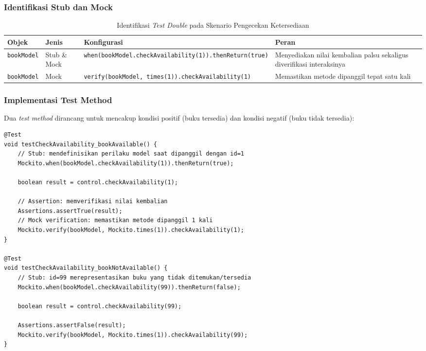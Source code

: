 \documentclass[12pt,a4paper]{article}
\begin{document}
\subsubsection{Identifikasi Stub dan Mock}

\begin{table}[H]
\centering
\caption{Identifikasi \textit{Test Double} pada Skenario Pengecekan Ketersediaan}
\label{tab:stub-mock-availability}
\begin{tabular}{@{}p{3.5cm}p{2.5cm}p{4.5cm}p{3cm}@{}}
\toprule
\textbf{Objek} & \textbf{Jenis} & \textbf{Konfigurasi} & \textbf{Peran} \\
\midrule
\texttt{bookModel} &
    Stub \& Mock &
    \texttt{when(bookModel.checkAvailability(1)).thenReturn(true)} &
    Menyediakan nilai kembalian palsu sekaligus diverifikasi interaksinya \\
\addlinespace
\texttt{bookModel} &
    Mock &
    \texttt{verify(bookModel, times(1)).checkAvailability(1)} &
    Memastikan metode dipanggil tepat satu kali \\
\bottomrule
\end{tabular}
\end{table}

\subsubsection{Implementasi Test Method}

Dua \textit{test method} dirancang untuk mencakup kondisi positif (buku
tersedia) dan kondisi negatif (buku tidak tersedia):

\begin{lstlisting}[caption={Test method pengecekan ketersediaan buku},
                   label={lst:test-availability}]
@Test
void testCheckAvailability_bookAvailable() {
    // Stub: mendefinisikan perilaku model saat dipanggil dengan id=1
    Mockito.when(bookModel.checkAvailability(1)).thenReturn(true);

    boolean result = control.checkAvailability(1);

    // Assertion: memverifikasi nilai kembalian
    Assertions.assertTrue(result);
    // Mock verification: memastikan metode dipanggil 1 kali
    Mockito.verify(bookModel, Mockito.times(1)).checkAvailability(1);
}

@Test
void testCheckAvailability_bookNotAvailable() {
    // Stub: id=99 merepresentasikan buku yang tidak ditemukan/tersedia
    Mockito.when(bookModel.checkAvailability(99)).thenReturn(false);

    boolean result = control.checkAvailability(99);

    Assertions.assertFalse(result);
    Mockito.verify(bookModel, Mockito.times(1)).checkAvailability(99);
}
\end{lstlisting}
\end{document}
